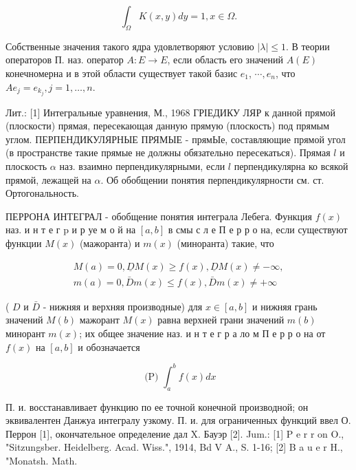 \documentclass[10pt]{article}
\begin{document}
\[

\int_{\Omega} K(x, y) d y=1, x \in \Omega .

\]



Собственные значения такого ядра удовлетворяют условию $|\lambda| \leqslant 1$. В теории операторов П. наз. оператор $A: E \rightarrow E$, если область его значений $A(E)$ конечномерна и в этой области существует такой базис $e_{1}$, $\cdots, e_{n}$, что $A e_{j}=e_{k_{j}}, j=1, \ldots, n$.



Лит.: [1] Интегральные уравнения, М., 1968 ГРІЕДИКУ ЛЯР к данной прямой (плоскости) прямая, пересекающая данную прямую (плоскость) под прямым углом. ПЕРПЕНДИКУЛЯРНЫЕ ПРЯМЫЕ - прямЫе, составляющие прямой угол (в пространстве такие прямые не должны обязательно пересекаться). Прямая $l$ и плоскость $\alpha$ наз. взаимно перпендикулярными, если $l$ перпендикулярна ко всякой прямой, лежащей на $\alpha$. Об обобщении понятия перпендикулярности см. ст. Ортогональность.



ПЕРРОНА ИНТЕГРАЛ - обобщение понятия интеграла Лебега. Функция $f(x)$ наз. и н т е г p и р уе м о й на $[a, b]$ в смы с л е П е р р о на, если существуют функции $M(x)$ (мажоранта) и $m(x)$ (миноранта) такие, что



\[

\begin{gathered}

M(a)=0, \underline{D} M(x) \geqslant f(x), \underline{D} M(x) \neq-\infty, \\

m(a)=0, \bar{D} m(x) \leqslant f(x), \bar{D} m(x) \neq+\infty

\end{gathered}

\]



( $D$ и $\bar{D}$ - нижняя и верхняя производные) для $x \in[a, b]$ и нижняя грань значений $M(b)$ мажорант $M(x)$ равна верхней грани значений $m(b)$ минорант $m(x)$; их общее значение наз. и н т е г р а ло м П е р р о на от $f(x)$ на $[a, b]$ и обозначается



\[

\text { (P) } \int_{a}^{b} f(x) d x

\]



П. и. восстанавливает функцию по ее точной конечной производной; он эквивалентен Данжуа интегралу узкому. П. и. для ограниченных функций ввел О. Перрон [1], окончательное определение дал X. Бауэр [2]. Jum.: [1] P e r r on O., "Sitzungsber. Heidelberg. Acad. Wiss.", 1914, Bd V A., S. 1-16; [2] B a u e r H., "Monatsh. Math.
\end{document}
